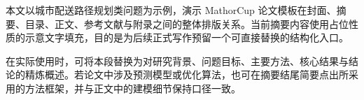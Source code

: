 本文以城市配送路径规划类问题为示例，演示 MathorCup 论文模板在封面、摘要、目录、正文、参考文献与附录之间的整体排版关系。当前摘要内容使用占位性质的示意文字填充，目的是为后续正式写作预留一个可直接替换的结构化入口。

在实际使用时，可将本段替换为对研究背景、问题目标、主要方法、核心结果与结论的精炼概述。若论文中涉及预测模型或优化算法，也可在摘要结尾简要点出所采用的方法框架，并与正文中的建模细节保持口径一致。
